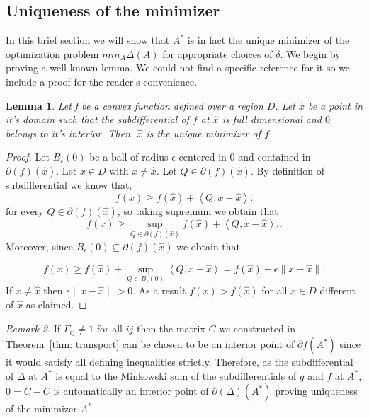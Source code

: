 \documentclass[12pt]{amsart}
\newtheorem{lemma}{Lemma}[section]
\theoremstyle{remark}
\newtheorem{remark}[lemma]{Remark}
\begin{document}
\subsection*{Uniqueness of the minimizer}
In this brief section we will show that $A^*$ is in fact the unique minimizer of the optimization problem $min_A\Delta (A)$ for appropriate choices of $\delta$.
We begin by proving a well-known lemma. We could not find a specific reference for it so we include a proof for the reader's convenience.

\begin{lemma}{\label{lemUniqueness}}
Let f be a convex function defined over a region $D$. Let $\hat{x}$ be a point in it's domain such that the subdifferential of $f$ at $\hat{x}$ is full dimensional and $0$ belongs to it's interior. Then, $\hat{x}$ is the unique minimizer of $f$.
\end{lemma}
\begin{proof}
Let $B_\epsilon(0)$ be a ball of radius $\epsilon$ centered in $0$ and contained in 
$\partial(f)(\hat{x})$. Let $x \in D \text{ with } x \neq \hat{x}$. Let $Q \in \partial(f)(\hat{x})$. By definition of subdifferential we know that, 
\[
f(x) \geq f(\hat{x}) + \left \langle Q,x-\hat{x} \right \rangle.
\]
for every $Q \in \partial(f)(\hat{x})$, so taking supremum we obtain that
\[
f(x) \geq \sup_{Q \in \partial(f)(\hat{x})} f(\hat{x}) + \left \langle Q,x-\hat{x} \right \rangle..
\]
Moreover, since $B_\epsilon(0) \subseteq \partial(f)(\hat{x})$ we obtain that

\[
 f(x) \geq f(\hat{x})+\sup_{Q \in B_\epsilon(0)} \left \langle Q,x-\hat{x} \right \rangle = f(\hat{x})+ \epsilon\| x-\hat{x} \|.
\]
If $x \neq \hat{x}$ then $\epsilon \| x-\hat{x} \|> 0$. As a result $f(x)>f(\hat{x})$ for all $x\in D$ different of $\hat{x}$ as claimed.

\end{proof}

\begin{remark}{\label{remUnicity}}
If $\widetilde{\Gamma_{ij}}\neq 1$ for all $ij$ then the matrix $C$ we constructed in Theorem~\ref{thm: transport} can be chosen to be an interior point of $\partial f(A^*)$ since it would satisfy all defining inequalities strictly. Therefore, as the subdifferential of $\Delta$ at $A^*$ is equal to the Minkowski sum of the subdifferentials of $g$ and $f$ at $A^*$,$0=C-C$ is automatically an interior point of $\partial(\Delta)(A^*)$ proving uniqueness of the minimizer $A^*$.
\end{remark}
\end{document}
